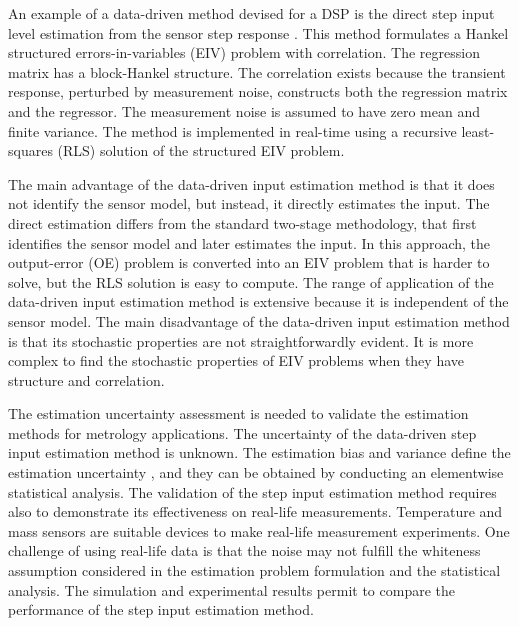 An example of a data-driven method devised for a DSP is the direct step input level estimation from the sensor step response \citep{Markovsky15cep}.
This method formulates a Hankel structured errors-in-variables (EIV) problem with correlation.
The regression matrix has a block-Hankel structure.
The correlation exists because the transient response, perturbed by measurement noise, constructs both the regression matrix and the regressor.
The measurement noise is assumed to have zero mean and finite variance.
The method is implemented in real-time using a recursive least-squares (RLS) solution of the structured EIV problem.

The main advantage of the data-driven input estimation method is that it does not identify the sensor model, but instead, it directly estimates the input. 
The direct estimation differs from the standard two-stage methodology, that first identifies the sensor model and later estimates the input.
In this approach, the output-error (OE) problem is converted into an EIV problem that is harder to solve, but the RLS solution is easy to compute.
The range of application of the data-driven input estimation method is extensive because it is independent of the sensor model.
The main disadvantage of the data-driven input estimation method is that its stochastic properties are not straightforwardly evident. 
It is more complex to find the stochastic properties of EIV problems when they have structure and correlation.


The estimation uncertainty assessment is needed to validate the estimation methods for metrology applications.
The uncertainty of the data-driven step input estimation method \citep{Markovsky15ieee} is unknown.
The estimation bias and variance define the estimation uncertainty \citep{Pintelon12Book}, and they can be obtained by conducting an elementwise statistical analysis. 
The validation of the step input estimation method requires also to demonstrate its effectiveness on real-life measurements.
Temperature and mass sensors are suitable devices to make real-life measurement experiments.
One challenge of using real-life data is that the noise may not fulfill the whiteness assumption considered in the estimation problem formulation and the statistical analysis.
The simulation and experimental results permit to compare the performance of the step input estimation method.

